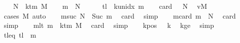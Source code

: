 \begin{isabellebody}
\ \ \isamarkupfalse%
\ {\isacharquery}{\kern0pt}N\ {\isacharequal}{\kern0pt}\ {\isachardoublequoteopen}k{\isacharunderscore}{\kern0pt}tm\ M{\isachardoublequoteclose}\isanewline
\ \ \isamarkupfalse%
\ {\isacharquery}{\kern0pt}m{}\ {\isacharequal}{\kern0pt}\ {\isachardoublequoteopen}{\isacharquery}{\kern0pt}N\ {\isacharminus}{\kern0pt}\ {}{\isachardoublequoteclose}\isanewline
\ \ \isamarkupfalse%
\ {\isacharquery}{\kern0pt}tl\ {\isacharequal}{\kern0pt}\ {\isachardoublequoteopen}k{\isacharunderscore}{\kern0pt}unidx\ {\isacharquery}{\kern0pt}m{}{\isachardoublequoteclose}\isanewline
\ \ \isamarkupfalse%
\ card{}{\isacharcolon}{\kern0pt}\ {\isachardoublequoteopen}{}\ {\isacharless}{\kern0pt}\ {\isacharquery}{\kern0pt}N{\isachardoublequoteclose}\ \isamarkupfalse%
\ vM\ \isamarkupfalse%
\ {\isacharparenleft}{\kern0pt}cases\ M{\isacharparenright}{\kern0pt}\ auto\isanewline
\ \ \isamarkupfalse%
\ m{}suc{\isacharcolon}{\kern0pt}\ {\isachardoublequoteopen}{\isacharquery}{\kern0pt}N\ {\isacharequal}{\kern0pt}\ Suc\ {\isacharquery}{\kern0pt}m{}{\isachardoublequoteclose}\ \isamarkupfalse%
\ card{}\ \isamarkupfalse%
\ simp\isanewline
\ \ \isamarkupfalse%
\ m{}card{\isacharcolon}{\kern0pt}\ {\isachardoublequoteopen}{\isacharquery}{\kern0pt}m{}\ {\isacharless}{\kern0pt}\ {\isacharquery}{\kern0pt}N{\isachardoublequoteclose}\ \isamarkupfalse%
\ card{}\ \isamarkupfalse%
\ simp\isanewline
\ \ \isamarkupfalse%
\ m{}lt{\isacharcolon}{\kern0pt}\ {\isachardoublequoteopen}{\isacharquery}{\kern0pt}m{}\ {\isacharless}{\kern0pt}\ k{\isacharunderscore}{\kern0pt}tm\ M{\isachardoublequoteclose}\ \isamarkupfalse%
\ card{}\ \isamarkupfalse%
\ simp\isanewline
\ \ \isamarkupfalse%
\ kpos{\isacharcolon}{\kern0pt}\ {\isachardoublequoteopen}{}\ {\isacharless}{\kern0pt}\ {\isacharquery}{\kern0pt}k{\isachardoublequoteclose}\ \isamarkupfalse%
\ kge{}\ \isamarkupfalse%
\ simp\isanewline
\ \ \isamarkupfalse%
\ tl{\isacharunderscore}{\kern0pt}eq{\isacharcolon}{\kern0pt}\ {\isachardoublequoteopen}{\isacharquery}{\kern0pt}tl\ {\isacharequal}{\kern0pt}\ {\isacharquery}{\kern0pt}m{}{\isachardoublequoteclose}\ \isamarkupfalse%

\end{isabellebody}
